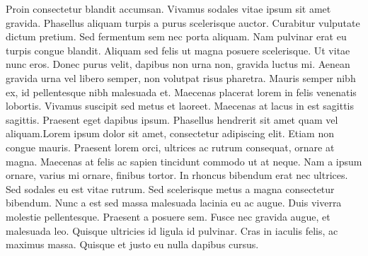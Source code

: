 \documentclass[12pt,letterpaper]{article}
\begin{document}
Proin consectetur blandit accumsan. Vivamus sodales vitae ipsum sit amet gravida. Phasellus aliquam turpis a purus scelerisque auctor. Curabitur vulputate dictum pretium. Sed fermentum sem nec porta aliquam. Nam pulvinar erat eu turpis congue blandit. Aliquam sed felis ut magna posuere scelerisque. Ut vitae nunc eros. Donec purus velit, dapibus non urna non, gravida luctus mi. Aenean gravida urna vel libero semper, non volutpat risus pharetra. Mauris semper nibh ex, id pellentesque nibh malesuada et. Maecenas placerat lorem in felis venenatis lobortis. Vivamus suscipit sed metus et laoreet. Maecenas at lacus in est sagittis sagittis. Praesent eget dapibus ipsum. Phasellus hendrerit sit amet quam vel aliquam.Lorem ipsum dolor sit amet, consectetur adipiscing elit. Etiam non congue mauris. Praesent lorem orci, ultrices ac rutrum consequat, ornare at magna. Maecenas at felis ac sapien tincidunt commodo ut at neque. Nam a ipsum ornare, varius mi ornare, finibus tortor. In rhoncus bibendum erat nec ultrices. Sed sodales eu est vitae rutrum. Sed scelerisque metus a magna consectetur bibendum. Nunc a est sed massa malesuada lacinia eu ac augue. Duis viverra molestie pellentesque. Praesent a posuere sem. Fusce nec gravida augue, et malesuada leo. Quisque ultricies id ligula id pulvinar. Cras in iaculis felis, ac maximus massa. Quisque et justo eu nulla dapibus cursus.
\end{document}

